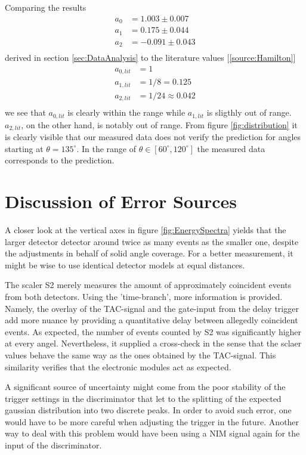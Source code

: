\documentclass[a4paper,parskip,11pt, DIV12]{scrreprt}
\begin{document}
Comparing the results
%
\begin{align*}
a_0 &= 1.003 \pm 0.007\\
a_1 &= 0.175 \pm 0.044\\
a_2 &= -0.091 \pm 0.043\\
\end{align*}
%
derived in section \ref{sec:DataAnalysis} to the literature values [\ref{source:Hamilton}]
%
\begin{align*}
a_{0,lit} &= 1\\
a_{1,lit} &= 1/8 = 0.125\\
a_{2,lit} &= 1/24 \approx 0.042\\
\end{align*}
%
we see that $a_{0,lit}$ is clearly within the range while $a_{1,lit}$ is sligthly out of range. $a_{2,lit}$, on the other hand, is notably out of range. From figure \ref{fig:distribution} it is clearly visible that our measured data does not verify the prediction for angles starting at $\theta=135^{\circ}$. In the range of $\theta \in \left[60^{\circ},120^{\circ}\right]$ the measured data corresponds to the prediction.

\section{Discussion of Error Sources}

A closer look at the vertical axes in figure \ref{fig:EnergySpectra} yields that the larger detector detector around twice as many events as the smaller one, despite the adjustments in behalf of solid angle coverage. For a better measurement, it might be wise to use identical detector models at equal distances.

The scaler S2 merely measures the amount of approximately coincident events from both detectors. Using the 'time-branch', more information is provided. Namely, the overlay of the TAC-signal and the gate-input from the delay trigger add more nuance by providing a quantitative delay between allegedly coincident events. As expected, the number of events counted by S2 was significantly higher at every angel. Nevertheless, it supplied a cross-check in the sense that the sclaer values behave the same way as the ones obtained by the TAC-signal. This similarity verifies that the electronic modules act as expected.

A significant source of uncertainty might come from the poor stability of the trigger settings in the discriminator that let to the splitting of the expected gaussian distribution into two discrete peaks. In order to avoid such error, one would have to be more careful when adjusting the trigger in the future. Another way to deal with this problem would have been using a NIM signal again for the input of the discriminator.
\end{document}
